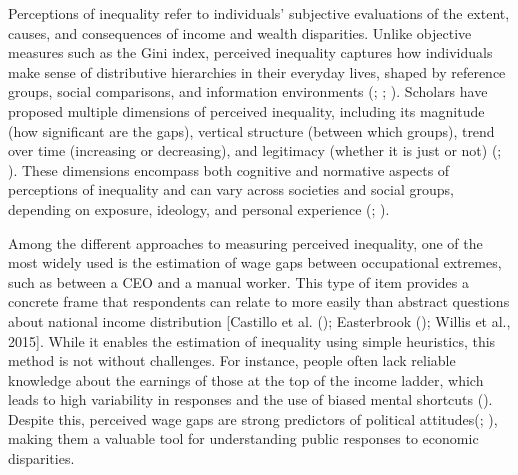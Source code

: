 \documentclass[
  12pt,
]{article}
\begin{document}
Perceptions of inequality refer to individuals' subjective evaluations
of the extent, causes, and consequences of income and wealth
disparities. Unlike objective measures such as the Gini index, perceived
inequality captures how individuals make sense of distributive
hierarchies in their everyday lives, shaped by reference groups, social
comparisons, and information environments
(; ; ).
Scholars have proposed multiple dimensions of perceived inequality,
including its magnitude (how significant are the gaps), vertical
structure (between which groups), trend over time (increasing or
decreasing), and legitimacy (whether it is just or not)
(;
). These dimensions encompass both cognitive and normative aspects
of perceptions of inequality and can vary across societies and social
groups, depending on exposure, ideology, and personal experience
(;
).

Among the different approaches to measuring perceived inequality, one of
the most widely used is the estimation of wage gaps between occupational
extremes, such as between a CEO and a manual worker. This type of item
provides a concrete frame that respondents can relate to more easily
than abstract questions about national income distribution {[}Castillo
et al. (); Easterbrook
(); Willis et al., 2015{]}.
While it enables the estimation of inequality using simple heuristics,
this method is not without challenges. For instance, people often lack
reliable knowledge about the earnings of those at the top of the income
ladder, which leads to high variability in responses and the use of
biased mental shortcuts (). Despite this, perceived wage gaps are strong predictors of
political
attitudes(; ), making them a valuable tool for understanding public responses
to economic disparities.
\end{document}

